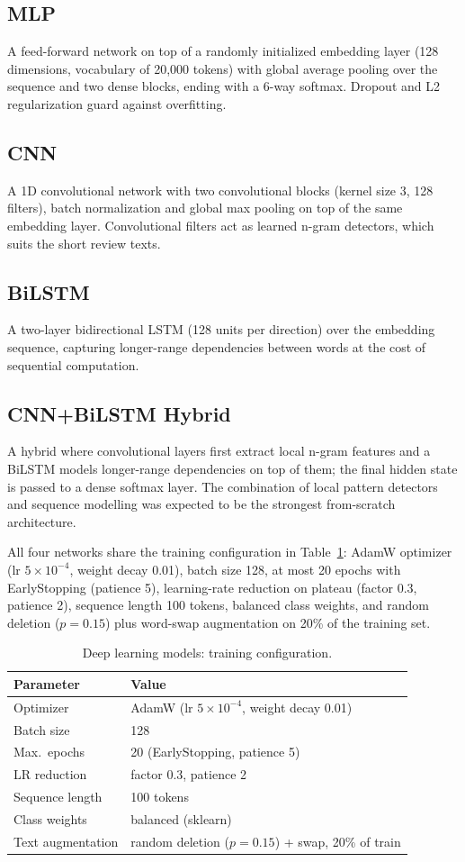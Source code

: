\documentclass[11pt]{article}
\begin{document}
\subsection{MLP}
A feed-forward network on top of a randomly initialized embedding layer (128 dimensions, vocabulary of 20,000 tokens) with global average pooling over the sequence and two dense blocks, ending with a 6-way softmax. Dropout and L2 regularization guard against overfitting.

\subsection{CNN}
A 1D convolutional network with two convolutional blocks (kernel size 3, 128 filters), batch normalization and global max pooling on top of the same embedding layer. Convolutional filters act as learned n-gram detectors, which suits the short review texts.

\subsection{BiLSTM}
A two-layer bidirectional LSTM (128 units per direction) over the embedding sequence, capturing longer-range dependencies between words at the cost of sequential computation.

\subsection{CNN+BiLSTM Hybrid}
A hybrid where convolutional layers first extract local n-gram features and a BiLSTM models longer-range dependencies on top of them; the final hidden state is passed to a dense softmax layer. The combination of local pattern detectors and sequence modelling was expected to be the strongest from-scratch architecture.

All four networks share the training configuration in Table~\ref{tab:dlconfig}: AdamW optimizer (lr $5\times10^{-4}$, weight decay 0.01), batch size 128, at most 20 epochs with EarlyStopping (patience 5), learning-rate reduction on plateau (factor 0.3, patience 2), sequence length 100 tokens, balanced class weights, and random deletion ($p=0.15$) plus word-swap augmentation on 20\% of the training set.

\begin{table}[h]
\centering
\caption{Deep learning models: training configuration.}
\label{tab:dlconfig}
\begin{tabular}{ll}
\hline
Parameter & Value \\
\hline
Optimizer & AdamW (lr $5\times10^{-4}$, weight decay 0.01) \\
Batch size & 128 \\
Max.\ epochs & 20 (EarlyStopping, patience 5) \\
LR reduction & factor 0.3, patience 2 \\
Sequence length & 100 tokens \\
Class weights & balanced (sklearn) \\
Text augmentation & random deletion ($p=0.15$) + swap, 20\% of train \\
\hline
\end{tabular}
\end{table}
\end{document}
